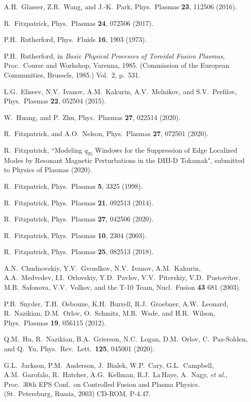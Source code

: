 \documentclass[12pt,prb,aps]{revtex4-1}
\begin{document}
\begin{thebibliography}{99}
 A.H.~Glasser, Z.R.~Wang, and J.-K.~Park, Phys.\ Plasmas {\bf 23}, 112506 (2016).

 R.~Fitzpatrick, Phys.\ Plasmas {\bf 24}, 072506 (2017). 

 P.H.~Rutherford,  Phys.\ Fluids  {\bf 16}, 1903 (1973).

 P.H.~Rutherford, in  {\it Basic Physical Processes of
Toroidal Fusion Plasmas}, Proc.\ Course and Workshop, Varenna, 1985. (Commission of the European Communities, Brussels, 1985.) Vol.~2, p.~531.

 L.G.~Eliseev, N.V.~Ivanov, A.M.~Kakurin, A.V.~Melnikov, and S.V.~Perfilov, Phys.\ Plasmas {\bf 22}, 052504 (2015). 

 W.~Huang, and P.~Zhu, Phys.\ Plasmas {\bf 27}, 022514 (2020).

 R.~Fitzpatrick, and A.O.~Nelson, Phys.\ Plasmas {\bf 27}, 072501 (2020).

 R.~Fitzpatrick,  ``Modeling $q_{95}$ Windows for the Suppression of Edge Localized
Modes by Resonant Magnetic Perturbations in the DIII-D Tokamak", submitted to Physics of Plasmas (2020).

 R.~Fitzpatrick, Phys.\ Plasmas {\bf 5}, 3325 (1998).

 R.~Fitzpatrick, Phys.\ Plasmas {\bf 21}, 092513 (2014).

 R.~Fitzpatrick, Phys.\ Plasmas {\bf 27}, 042506 (2020).

 R.~Fitzpatrick, Phys.\ Plasmas {\bf 10}, 2304 (2003).

 R.~Fitzpatrick, Phys.\ Plasmas {\bf 25}, 082513 (2018).			

 A.N.~Chudnovskiy, Y.V.~Gvozdkov, N.V.~Ivanov, A.M.~Kakurin,
A.A.~Medvedev, I.I.~Orlovskiy, Y.D.~Pavlov, V.V.~Piterskiy, V.D.~Pustovitov,
M.B.~Safonova, V.V.~Volkov, and the T-10 Team, Nucl.\ Fusion {\bf 43} 681 (2003).

 P.B.~Snyder, T.H.~Osboune, K.H.~Burrell, R.J.~Groebner, A.W.~Leonard, R.~Nazikian, D.M.~Orlov, O.~Schmitz, M.R.~Wade, and H.R.~Wilson, 
 Phys.\ Plasmas {\bf 19}, 056115 (2012).

 Q.M.~Hu, R.~Nazikian, B.A.~Grierson, N.C.~Logan, D.M.~Orlov, C.~Paz-Solden, and Q.~Yu, 
Phys.\ Rev.\ Lett.\ {\bf 125}, 045001 (2020).

 G.L.~Jackson, P.M.~Anderson, J.~Bialek, W.P.~Cary, G.L.~Campbell, A.M.~Garofalo,  R.~Hatcher, A.G.~Kellman, R.J.~La\,Haye, A.~Nagy, {\em et al.},  
Proc.\ 30th EPS Conf.\ on Controlled Fusion and Plasma Physics. (St.\ Petersburg, Russia, 2003) CD-ROM, P-4.47.


\end{thebibliography}
\end{document}
